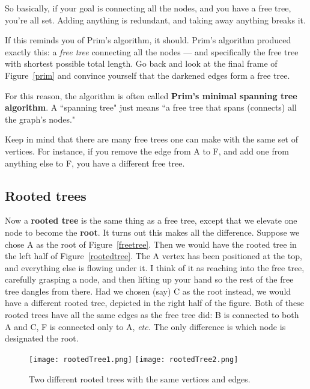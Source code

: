 So basically, if your goal is connecting all the nodes, and you have a free
tree, you're all set. Adding anything is redundant, and taking away
anything breaks it.

If this reminds you of Prim's algorithm, it should. Prim's algorithm
produced exactly this: a \textit{free tree} connecting all the nodes ---
and specifically the free tree with shortest possible total length. Go back
and look at the final frame of Figure~\ref{prim} and convince yourself that
the darkened edges form a free tree.

For this reason, the algorithm is often called \textbf{Prim's minimal
spanning tree algorithm}. A ``spanning tree" just means ``a free tree that
spans (connects) all the graph's nodes." 

Keep in mind that there are many free trees one can make with the same set
of vertices. For instance, if you remove the edge from A to F, and add one
from anything else to F, you have a different free tree.

\subsection{Rooted trees}

Now a \textbf{rooted tree} is the same thing as a free tree, except that we
elevate one node to become the \textbf{root}. It turns out this makes all
the difference. Suppose we chose A as the root of Figure~\ref{freetree}.
Then we would have the rooted tree in the left half of
Figure~\ref{rootedtree}. The A vertex has been positioned at the top, and
everything else is flowing under it. I think of it as reaching into the
free tree, carefully grasping a node, and then lifting up your hand so the
rest of the free tree dangles from there. Had we chosen (say) C as the root
instead, we would have a different rooted tree, depicted in the right half
of the figure. Both of these rooted trees have all the same edges as the
free tree did: B is connected to both A and C, F is connected only to A,
\textit{etc.} The only difference is which node is designated the root.

\begin{figure}[ht]
\centering
\begin{custommargins}{-2.1cm}{-3cm}
\texttt{[image: rootedTree1.png]} \quad\quad\quad
\texttt{[image: rootedTree2.png]}
\caption{Two different rooted trees with the same vertices and edges.}
\label{rootedtree}
\end{custommargins}
\label{page:rootedtree}
\end{figure}

